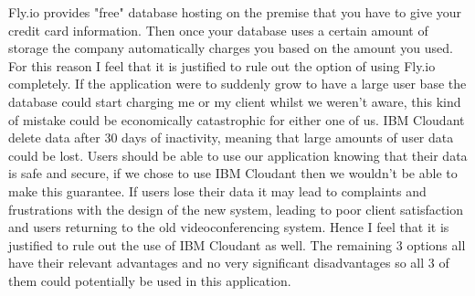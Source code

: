 Fly.io provides "free" database hosting on the premise that
you have to give your credit card information. Then once
your database uses a certain amount of storage the company
automatically charges you based on the amount you used. For
this reason I feel that it is justified to rule out the
option of using Fly.io completely. If the application were
to suddenly grow to have a large user base the database could
start charging me or my client whilst we weren't aware, this
kind of mistake could be economically catastrophic for either
one of us. IBM Cloudant delete data after 30 days of
inactivity, meaning that large amounts of user data could
be lost. Users should be able to use our application knowing
that their data is safe and secure, if we chose to use IBM
Cloudant then we wouldn't be able to make this guarantee. If
users lose their data it may lead to complaints and
frustrations with the design of the new system, leading to
poor client satisfaction and users returning to the old
videoconferencing system. Hence I feel that it is justified
to rule out the use of IBM Cloudant as well. The remaining 3
options all have their relevant advantages and no very
significant disadvantages so all 3 of them could potentially
be used in this application. \\ \vspace{0.2cm}

